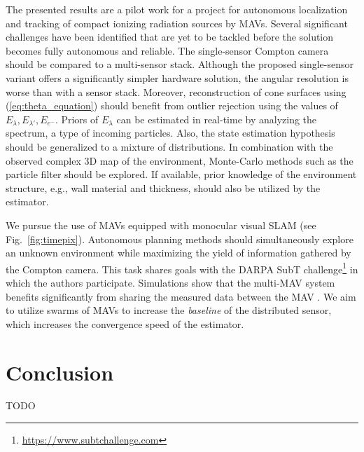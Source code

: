 \documentclass[a4paper,11pt,titlepage,twoside]{book}
\newcommand{\todo}[1]{{\color{red} TODO {#1}}}
\newcommand{\reffig}[1]{Fig.~\ref{#1}}
\newcommand{\chapternoclear}[1]{
  \begingroup
  \let\cleardoublepage\clearpage
  \chapter{#1}
  \endgroup
}
\begin{document}
  The presented results are a pilot work for a project for autonomous localization and tracking of compact ionizing radiation sources by \aclp{MAV}.
  Several significant challenges have been identified that are yet to be tackled before the solution becomes fully autonomous and reliable.
  The single-sensor Compton camera should be compared to a multi-sensor stack.
  Although the proposed single-sensor variant offers a significantly simpler hardware solution, the angular resolution is worse than with a sensor stack.
  Moreover, reconstruction of cone surfaces using (\ref{eq:theta_equation}) should benefit from outlier rejection using the values of $E_\lambda, E_{\lambda'}, E_{e^{-}}$.
  Priors of $E_\lambda$ can be estimated in real-time by analyzing the spectrum, a type of incoming particles.
  Also, the state estimation hypothesis should be generalized to a mixture of distributions.
  In combination with the observed complex 3D map of the environment, Monte-Carlo methods such as the particle filter should be explored.
  If available, prior knowledge of the environment structure, e.g., wall material and thickness, should also be utilized by the estimator.

  We pursue the use of \acp{MAV} equipped with monocular visual \ac{SLAM} (see \reffig{fig:timepix}).
  Autonomous planning methods should simultaneously explore an unknown environment while maximizing the yield of information gathered by the Compton camera.
  This task shares goals with the \ac{DARPA} SubT challenge\footnote{\url{https://www.subtchallenge.com}} in which the authors participate.
  Simulations show that the multi-\ac{MAV} system benefits significantly from sharing the measured data between the \acs{MAV} \cite{stibinger2020localization}.
  We aim to utilize swarms of \acp{MAV} to increase the \emph{baseline} of the distributed sensor, which increases the convergence speed of the estimator.





\chapternoclear{Conclusion}

\todo{}




\appendix
\renewcommand\chaptername{Appendix}
\end{document}
